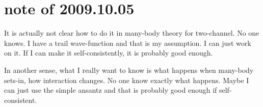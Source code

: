 \section{note of 2009.10.05}
It is actually not clear how to do it in many-body theory for two-channel. No one knows.  I have a trail wave-function and that is my assumption.  I can just work on it.  If I can make it self-consistently, it is probably good enough.  

In another sense, what I really want to know is what happens when many-body sets-in, how interaction changes.  No one know exactly what happens.  Maybe I can just use the simple ansantz and that is probably good enough if self-consistent.  
